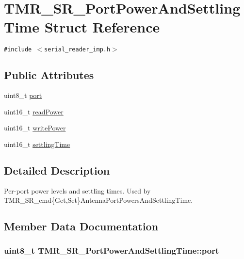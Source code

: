 \hypertarget{struct_t_m_r___s_r___port_power_and_settling_time}{
\section{TMR\_\-SR\_\-PortPowerAndSettlingTime Struct Reference}
\label{struct_t_m_r___s_r___port_power_and_settling_time}
}
{\tt \#include $<$serial\_\-reader\_\-imp.h$>$}

\subsection*{Public Attributes}
\begin{CompactItemize}
\item 
uint8\_\-t \hyperlink{struct_t_m_r___s_r___port_power_and_settling_time_337f99c4ae3be144ffdc227623bfb0e3}{port}
\item 
uint16\_\-t \hyperlink{struct_t_m_r___s_r___port_power_and_settling_time_82a346e3e5eb4484bc83a235e17630c0}{readPower}
\item 
uint16\_\-t \hyperlink{struct_t_m_r___s_r___port_power_and_settling_time_dc46c39f7165e214e9a233a4256d91c7}{writePower}
\item 
uint16\_\-t \hyperlink{struct_t_m_r___s_r___port_power_and_settling_time_33aac95957a2b7864ccb0fe59e995df5}{settlingTime}
\end{CompactItemize}


\subsection{Detailed Description}
Per-port power levels and settling times. Used by TMR\_\-SR\_\-cmd\{Get,Set\}AntennaPortPowersAndSettlingTime. 

\subsection{Member Data Documentation}
\hypertarget{struct_t_m_r___s_r___port_power_and_settling_time_337f99c4ae3be144ffdc227623bfb0e3}{
\subsubsection[{port}]{\setlength{\rightskip}{0pt plus 5cm}uint8\_\-t {\bf TMR\_\-SR\_\-PortPowerAndSettlingTime::port}}}
\label{struct_t_m_r___s_r___port_power_and_settling_time_337f99c4ae3be144ffdc227623bfb0e3}


